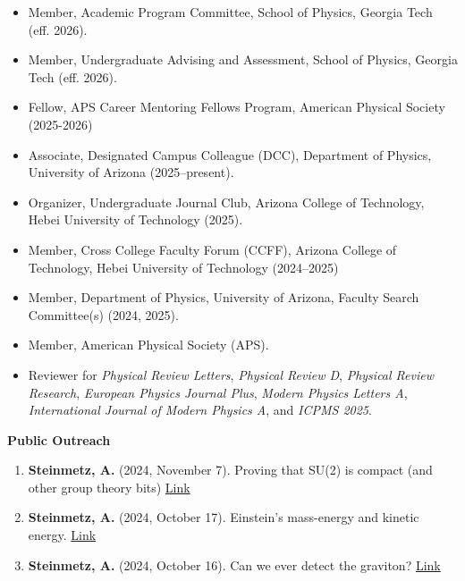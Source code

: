 \documentclass[11pt]{article}
\begin{document}
\begin{itemize}[leftmargin=*,nosep]
    \item Member, Academic Program Committee, School of Physics, Georgia Tech (eff. 2026).
    \item Member, Undergraduate Advising and Assessment, School of Physics, Georgia Tech (eff. 2026).
    \item Fellow, APS Career Mentoring Fellows Program, American Physical Society (2025-2026)
    \item Associate, Designated Campus Colleague (DCC), Department of Physics, University of Arizona (2025--present).
    \item Organizer, Undergraduate Journal Club, Arizona College of Technology, Hebei University of Technology (2025).
    \item Member, Cross College Faculty Forum (CCFF), Arizona College of Technology, Hebei University of Technology (2024--2025)
    \item Member, Department of Physics, University of Arizona, Faculty Search Committee(s) (2024, 2025).
    \item Member, American Physical Society (APS).
    \item Reviewer for \textit{Physical Review Letters}, \textit{Physical Review D}, \textit{Physical Review Research}, \textit{European Physics Journal Plus}, \textit{Modern Physics Letters A}, \textit{International Journal of Modern Physics A}, and \textit{ICPMS 2025}.
\end{itemize}

\medskip

{\large\textbf{Public Outreach}}

\begin{enumerate}[leftmargin=*,nosep]
    \item \textbf{Steinmetz, A.} (2024, November 7). Proving that SU(2) is compact (and other group theory bits) \href{https://ajsteinmetz.github.io/mathematics/2024/11/07/su2-compactness.html}{Link}
    \item \textbf{Steinmetz, A.} (2024, October 17). Einstein’s mass-energy and kinetic energy. \href{https://ajsteinmetz.github.io/physics/2024/10/17/kinetic-energy-coefficient.html}{Link}
    \item \textbf{Steinmetz, A.} (2024, October 16). Can we ever detect the graviton? \href{https://ajsteinmetz.github.io/physics/2024/10/16/graviton-detector.html}{Link}
\end{enumerate}

\medskip
\end{document}
